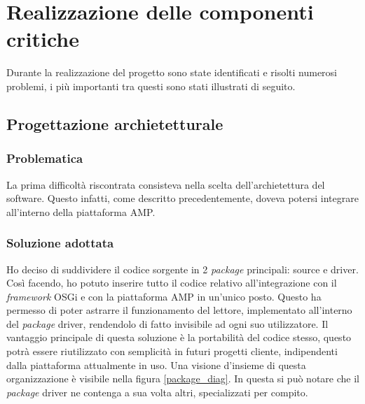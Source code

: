 

\section{Realizzazione delle componenti critiche}
Durante la realizzazione del progetto sono state identificati e risolti numerosi problemi, i più importanti tra questi sono stati illustrati di seguito.
\subsection{Progettazione archietetturale}

\subsubsection*{Problematica}
La prima difficoltà riscontrata consisteva nella scelta dell'archietettura del software. Questo infatti, come descritto precedentemente, 
doveva potersi integrare all'interno della piattaforma AMP. 

\subsubsection*{Soluzione adottata}
Ho deciso di suddividere il codice sorgente in 2 \emph{package} principali: source e driver. Così facendo, ho potuto inserire tutto
il codice relativo all'integrazione con il \emph{framework} OSGi e con la piattaforma AMP in un'unico posto.
Questo ha permesso di poter astrarre il funzionamento del lettore, implementato all'interno del \emph{package} driver, rendendolo
di fatto invisibile ad ogni suo utilizzatore. Il vantaggio principale di questa soluzione è la portabilità del codice stesso, questo
potrà essere riutilizzato con semplicità in futuri progetti cliente, indipendenti dalla piattaforma attualmente in uso.
Una visione d'insieme di questa organizzazione è visibile nella figura \ref{package_diag}. In questa si può notare che il \emph{package}
driver ne contenga a sua volta altri, specializzati per compito.

